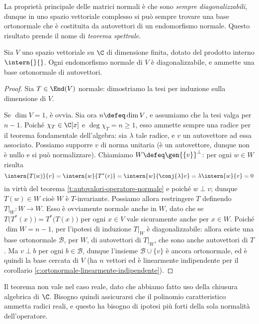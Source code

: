 La proprietà principale delle matrici normali è che sono \emph{sempre diagonalizzabili}, dunque in uno spazio vettoriale complesso si può sempre trovare una base ortonormale che è costituita da autovettori di un endomorfismo normale.
Questo risultato prende il nome di \emph{teorema spettrale}.
\begin{teorema} \label{t:spettrale-complesso}
	Sia $V$ uno spazio vettoriale su $\C$ di dimensione finita, dotato del prodotto interno $\intern{}{}$.
	Ogni endomorfismo normale di $V$ è diagonalizzabile, e ammette una base ortonormale di autovettori.
\end{teorema}
\begin{proof}
	Sia $T\in\End(V)$ normale: dimostriamo la tesi per induzione sulla dimensione di $V$.

	Se $\dim V=1$, è ovvia.
	Sia ora $n\defeq\dim V$, e assumiamo che la tesi valga per $n-1$.
	Poich\'e $\chi_T\in\C[x]$ e $\deg\chi_T=n\ge 1$, esso ammette sempre una radice per il teorema fondamentale dell'algebra: sia $\lambda$ tale radice, e $v$ un autovettore ad essa associato.
	Possiamo supporre $v$ di norma unitaria (è un autovettore, dunque non è nullo e si può normalizzare).
	Chiamiamo $W\defeq\gen{\{v\}}^\perp$: per ogni $w\in W$ risulta
	\begin{equation}
		\intern{T(w)}{v}=\intern{w}{T^*(v)}=\intern{w}{\conj{\lambda}v}=\lambda\intern{w}{v}=0
	\end{equation}
	in virtù del teorema \ref{t:autovalori-operatore-normale} e poich\'e $w\perp v$; dunque $T(w)\in W$ cioè $W$ è $T$-invariante.
	Possiamo allora restringere $T$ definendo $T|_W\colon W\to W$.
	Esso è ovviamente normale anche in $W$, dato che se $T\big(T^*(x)\big)=T^*\big(T(x)\big)$ per ogni $x\in V$ vale sicuramente anche per $x\in W$.
	Poich\'e $\dim W=n-1$, per l'ipotesi di induzione $T|_W$ è diagonalizzabile: allora esiste una base ortonormale $\mathcal B$, per $W$, di autovettori di $T|_W$, che sono anche autovettori di $T$.
	Ma $v\perp b$ per ogni $b\in\mathcal B$, dunque l'insieme $\mathcal B\cup\{v\}$ è ancora ortonormale, ed è quindi la base cercata di $V$ (ha $n$ vettori ed è linearmente indipendente per il corollario \ref{c:ortonormale-linearmente-indipendente}).
\end{proof}
Il teorema non vale nel caso reale, dato che abbiamo fatto uso della chiusura algebrica di $\C$.
Bisogno quindi assicurarsi che il polinomio caratteristico ammetta radici reali, e questo ha bisogno di ipotesi più forti della sola normalità dell'operatore.

